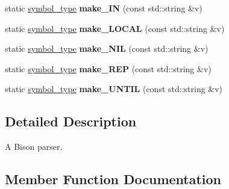 \begin{DoxyCompactItemize}
\item 
\hypertarget{classyy_1_1parser_ac3ae3318cdeb263113e958df72f6891b}{}static \hyperlink{classyy_1_1parser_aa8024edbba983aa5cd3e88c3a4dcacc9}{symbol\+\_\+type} {\bfseries make\+\_\+\+I\+N} (const std\+::string \&v)\label{classyy_1_1parser_ac3ae3318cdeb263113e958df72f6891b}

\item 
\hypertarget{classyy_1_1parser_adca28b46143c93bcf6a15d6f2f19c26e}{}static \hyperlink{classyy_1_1parser_aa8024edbba983aa5cd3e88c3a4dcacc9}{symbol\+\_\+type} {\bfseries make\+\_\+\+L\+O\+C\+A\+L} (const std\+::string \&v)\label{classyy_1_1parser_adca28b46143c93bcf6a15d6f2f19c26e}

\item 
\hypertarget{classyy_1_1parser_aca54532ab251e0b46fe7ee581d75edf9}{}static \hyperlink{classyy_1_1parser_aa8024edbba983aa5cd3e88c3a4dcacc9}{symbol\+\_\+type} {\bfseries make\+\_\+\+N\+I\+L} (const std\+::string \&v)\label{classyy_1_1parser_aca54532ab251e0b46fe7ee581d75edf9}

\item 
\hypertarget{classyy_1_1parser_aaa001cb07460543d57b4638fab36e20f}{}static \hyperlink{classyy_1_1parser_aa8024edbba983aa5cd3e88c3a4dcacc9}{symbol\+\_\+type} {\bfseries make\+\_\+\+R\+E\+P} (const std\+::string \&v)\label{classyy_1_1parser_aaa001cb07460543d57b4638fab36e20f}

\item 
\hypertarget{classyy_1_1parser_a2934454169abd544ad974913ba6f923f}{}static \hyperlink{classyy_1_1parser_aa8024edbba983aa5cd3e88c3a4dcacc9}{symbol\+\_\+type} {\bfseries make\+\_\+\+U\+N\+T\+I\+L} (const std\+::string \&v)\label{classyy_1_1parser_a2934454169abd544ad974913ba6f923f}

\end{DoxyCompactItemize}


\subsection{Detailed Description}
A Bison parser. 

\subsection{Member Function Documentation}
\hypertarget{classyy_1_1parser_a3a740797fdf8f0ea046b20ffbc6c3f08}{}
